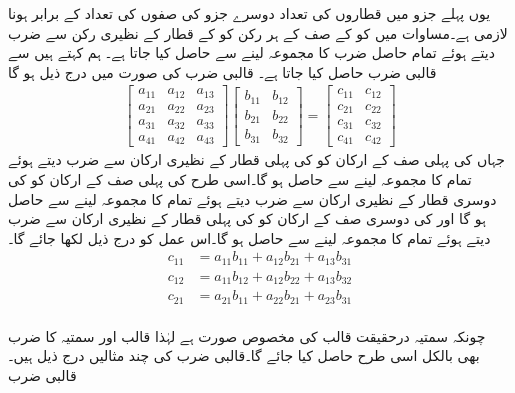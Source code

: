 یوں پہلے جزو  میں قطاروں کی تعداد  دوسرے جزو  کی صفوں کی تعداد  کے برابر ہونا لازمی ہے۔مساوات  میں  کو  کے  صف کے ہر رکن کو  کے  قطار کے نظیری رکن سے ضرب دیتے ہوئے تمام  حاصل ضرب کا مجموعہ لینے سے حاصل کیا جاتا ہے۔ ہم کہتے ہیں  سے قالبی ضرب حاصل کیا جاتا ہے۔ قالبی ضرب  کی صورت میں درج ذیل ہو گا
\begin{align*}
\begin{bmatrix}
a_{11}& a_{12} & a_{13}\\
a_{21}& a_{22} & a_{23}\\
a_{31}& a_{32} & a_{33}\\
a_{41} & a_{42} & a_{43}
\end{bmatrix}
\begin{bmatrix}
b_{11}& b_{12}\\
b_{21}& b_{22}\\
b_{31}& b_{32}
\end{bmatrix}=
\begin{bmatrix}
c_{11} & c_{12}\\
c_{21} & c_{22}\\
c_{31} & c_{32}\\
c_{41} & c_{42}
\end{bmatrix}
\end{align*}
جہاں  کی پہلی صف کے ارکان کو  کی پہلی قطار کے نظیری ارکان سے ضرب دیتے ہوئے تمام کا مجموعہ لینے سے  حاصل ہو گا۔اسی طرح  کی پہلی صف کے ارکان کو  کی دوسری قطار کے نظیری ارکان سے ضرب دیتے ہوئے تمام کا مجموعہ لینے سے  حاصل ہو گا اور   کی دوسری صف کے ارکان کو  کی پہلی قطار کے نظیری ارکان سے ضرب دیتے ہوئے تمام کا مجموعہ لینے سے  حاصل ہو گا۔اس عمل کو درج ذیل لکھا جائے گا۔
\begin{align*}
c_{11}&=a_{11}b_{11}+a_{12}b_{21}+a_{13}b_{31}\\
c_{12}&=a_{11}b_{12}+a_{12}b_{22}+a_{13}b_{32}\\
c_{21}&=a_{21}b_{11}+a_{22}b_{21}+a_{23}b_{31}\\
\end{align*}
 
چونکہ سمتیہ درحقیقت قالب کی مخصوص صورت ہے لہٰذا قالب اور سمتیہ کا ضرب بھی بالکل اسی طرح حاصل کیا جائے گا۔قالبی ضرب کی چند مثالیں درج ذیل ہیں۔
\quad قالبی ضرب\\


